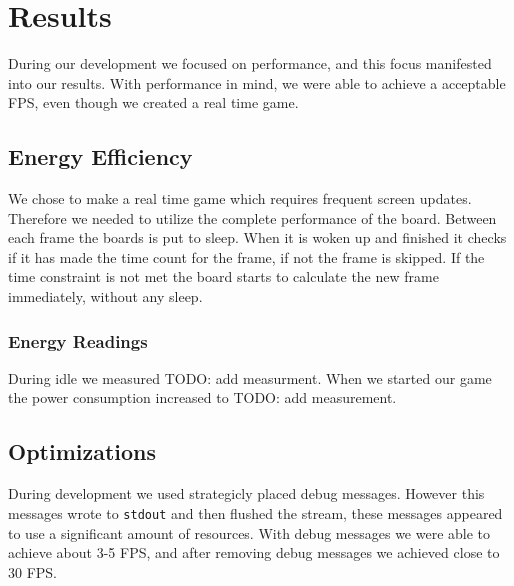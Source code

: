 \chapter{Results}
During our development we focused on performance, and this focus manifested into our results. With performance in mind, we were able to achieve a acceptable FPS, even though we created a real time game.

\section{Energy Efficiency}
We chose to make a real time game which requires frequent screen updates. Therefore we needed to utilize the complete performance of the board. Between each frame the boards is put to sleep. When it is woken up and finished it checks if it has made the time count for the frame, if not the frame is skipped. If the time constraint is not met the board starts to calculate the new frame immediately, without any sleep.

\subsection{Energy Readings}
During idle we measured TODO: add measurment. When we started our game the power consumption increased to TODO: add measurement.


\section{Optimizations}
During development we used strategicly placed debug messages. However this messages wrote to \texttt{stdout} and then flushed the stream, these messages appeared to use a significant amount of resources. With debug messages we were able to achieve about 3-5 FPS, and after removing debug messages we achieved close to 30 FPS.